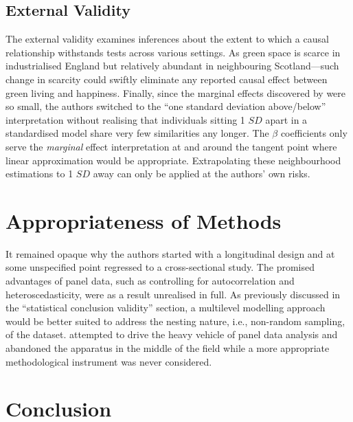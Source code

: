 \subsection{External Validity}

The external validity examines inferences about the extent to which a causal relationship withstands tests across various settings. As green space is scarce in industrialised England but relatively abundant in neighbouring Scotland---such change in scarcity could swiftly eliminate any reported causal effect between green living and happiness. Finally, since the marginal effects discovered by \textcite{white:2013} were so small, the authors switched to the ``one standard deviation above/below'' interpretation without realising that individuals sitting 1 $SD$ apart in a standardised model share very few similarities any longer. The $\beta$ coefficients only serve the \emph{marginal} effect interpretation at and around the tangent point where linear approximation would be appropriate. Extrapolating these neighbourhood estimations to 1 $SD$ away can only be applied at the authors' own risks.

\section{Appropriateness of Methods}

It remained opaque why the authors started with a longitudinal design and at some unspecified point regressed to a cross-sectional study. The promised advantages of panel data, such as controlling for autocorrelation and heteroscedasticity, were as a result unrealised in full. As previously discussed in the ``statistical conclusion validity'' section, a multilevel modelling approach would be better suited to address the nesting nature, i.e., non-random sampling, of the dataset. \textcite{white:2013} attempted to drive the heavy vehicle of panel data analysis and abandoned the apparatus in the middle of the field while a more appropriate methodological instrument was never considered.

\section{Conclusion}

